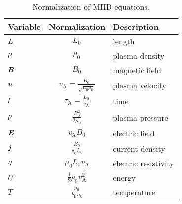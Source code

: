\begin{table}[ht]
  \centering
  \begin{tabular}{|l||c|l|}
    \hline
    Variable  & Normalization & Description \\
    \hline
    \hline
    $L$       & $L_0$ & length \\
    \hline
    $\rho$    & $\rho_0$ & plasma density \\
    \hline
    $\boldsymbol{B}$ & $B_0$ & magnetic field \\
    \hline
    $\boldsymbol{u}$ & $v_\mathrm{A}=\frac{B_0}{\sqrt{\mu_0\rho_0}}$ & plasma velocity \\
    \hline
    $t$       & $\tau_\mathrm{A}=\frac{L_0}{v_\mathrm{A}}$ & time \\
    \hline
    $p$       & $\frac{B_0^2}{2\mu_0}$ & plasma pressure \\
    \hline
    $\boldsymbol{E}$ & $v_\mathrm{A}B_0$ & electric field \\
    \hline
    $\boldsymbol{j}$ & $\frac{B_0}{\mu_0L_0}$ & current density \\
    \hline
    $\eta$    & $\mu_0L_0v_\mathrm{A}$ & electric resistivity \\
    \hline
    $U$       & $\frac{1}{2}\rho_0v_\mathrm{A}^2$ & energy \\
    \hline
    $T$       & $\frac{p_0}{k_\mathrm{B}n_0}$ & temperature \\
    \hline
  \end{tabular}
  \caption{Normalization of MHD equations.}
  \label{Tab:MHDNormalization}
\end{table}

